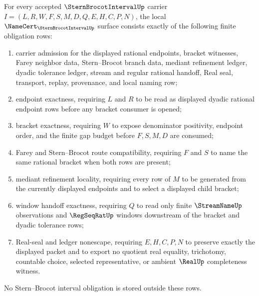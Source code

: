 \begin{theorem}
\label{thm:stern-brocot-interval-namecert-obligations}
For every accepted $\SternBrocotIntervalUp$ carrier $I=(L,R,W,F,S,M,D,Q,E,H,C,P,N)$, the local $\NameCert_{\SternBrocotIntervalUp}$ surface consists exactly of the following finite obligation rows:
\begin{enumerate}
\item carrier admission for the displayed rational endpoints, bracket witnesses, Farey neighbor data, Stern--Brocot branch data, mediant refinement ledger, dyadic tolerance ledger, stream and regular rational handoff, Real seal, transport, replay, provenance, and local naming row;
\item endpoint exactness, requiring $L$ and $R$ to be read as displayed dyadic rational endpoint rows before any bracket consumer is opened;
\item bracket exactness, requiring $W$ to expose denominator positivity, endpoint order, and the finite gap budget before $F,S,M,D$ are consumed;
\item Farey and Stern--Brocot route compatibility, requiring $F$ and $S$ to name the same rational bracket when both rows are present;
\item mediant refinement locality, requiring every row of $M$ to be generated from the currently displayed endpoints and to select a displayed child bracket;
\item window handoff exactness, requiring $Q$ to read only finite $\StreamNameUp$ observations and $\RegSeqRatUp$ windows downstream of the bracket and dyadic tolerance rows;
\item Real-seal and ledger nonescape, requiring $E,H,C,P,N$ to preserve exactly the displayed packet and to export no quotient real equality, trichotomy, countable choice, selected representative, or ambient $\RealUp$ completeness witness.
\end{enumerate}
No Stern--Brocot interval obligation is stored outside these rows.
\end{theorem}
